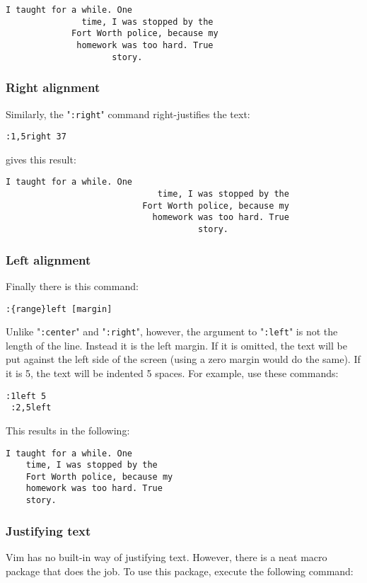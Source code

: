 \begin{Verbatim}[samepage=true]
			   I taught for a while. One 
			   time, I was stopped by the 
			 Fort Worth police, because my 
			  homework was too hard. True 
				     story. 
\end{Verbatim}
\subsubsection{Right alignment}
Similarly, the "\verb!:right!" command right-justifies the text:

\begin{Verbatim}[samepage=true]
 :1,5right 37
\end{Verbatim}

gives this result:

\begin{Verbatim}[samepage=true]
						       I taught for a while. One 
						      time, I was stopped by the 
						   Fort Worth police, because my 
						     homework was too hard. True 
									  story. 
\end{Verbatim}
\subsubsection{Left alignment}
Finally there is this command:

\begin{Verbatim}[samepage=true]
 :{range}left [margin]
\end{Verbatim}

Unlike "\verb!:center!" and "\verb!:right!", however, the argument to "\verb!:left!" is not the length of the line.
Instead it is the left margin.
If it is omitted, the text will be put against the left side of the screen (using a zero margin would do the same).
If it is 5, the text will be indented 5 spaces.
For example, use these commands:

\begin{Verbatim}[samepage=true]
 :1left 5
 :2,5left
\end{Verbatim}

This results in the following:

\begin{Verbatim}[samepage=true]
         I taught for a while. One 
    time, I was stopped by the 
    Fort Worth police, because my 
    homework was too hard. True 
    story. 
\end{Verbatim}

\subsubsection{Justifying text}
Vim has no built-in way of justifying text.
However, there is a neat macro package that does the job.
To use this package, execute the following command:


